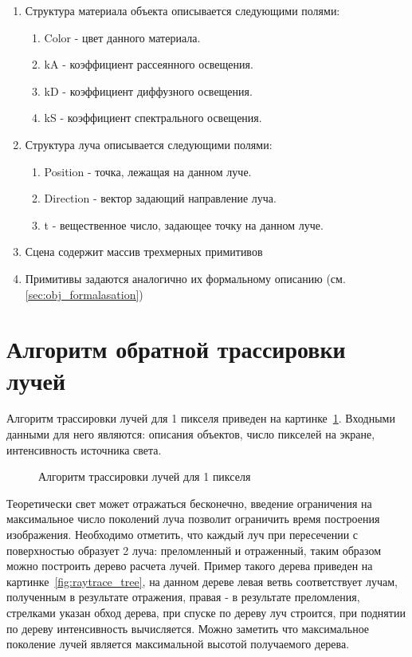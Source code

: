 \begin{enumerate}
	\item Структура материала объекта описывается следующими полями:
	\begin{enumerate}[label*=\arabic*.]
		\item Color - цвет данного материала.
		\item kA - коэффициент рассеянного освещения.
		\item kD - коэффициент диффузного освещения.
		\item kS - коэффициент спектрального освещения.
	\end{enumerate}


	\item Структура луча описывается следующими полями:
	\begin{enumerate}[label*=\arabic*.]
		\item Position - точка, лежащая на данном луче.
		\item Direction - вектор задающий направление луча.
		\item t - вещественное число, задающее точку на данном луче.
	\end{enumerate}

	\item Сцена содержит массив трехмерных примитивов
	\item Примитивы задаются аналогично их формальному описанию (см.\ref{sec:obj_formalasation})
\end{enumerate}



\section{Алгоритм обратной трассировки лучей}
Алгоритм трассировки лучей для 1 пикселя приведен на картинке~\ref{fig:raytrace_algo_pixel}. Входными данными для него являются: описания объектов, число пикселей на экране,
интенсивность источника света.

\begin{figure}[H]
	\centering
	
	\caption{Алгоритм трассировки лучей для 1 пикселя}
	\label{fig:raytrace_algo_pixel}
\end{figure}

Теоретически свет может отражаться бесконечно, введение ограничения на максимальное число поколений луча позволит ограничить время построения изображения.
Необходимо отметить, что каждый луч при пересечении с поверхностью образует 2 луча: преломленный и отраженный, таким образом можно построить дерево расчета лучей.
Пример такого дерева приведен на картинке~\ref{fig:raytrace_tree}, на данном дереве левая ветвь соответствует лучам, полученным в результате отражения, правая - в результате преломления,
стрелками указан обход дерева, при спуске по дереву луч строится, при поднятии по дереву интенсивность вычисляется. Можно заметить что максимальное поколение лучей является максимальной высотой получаемого дерева.

